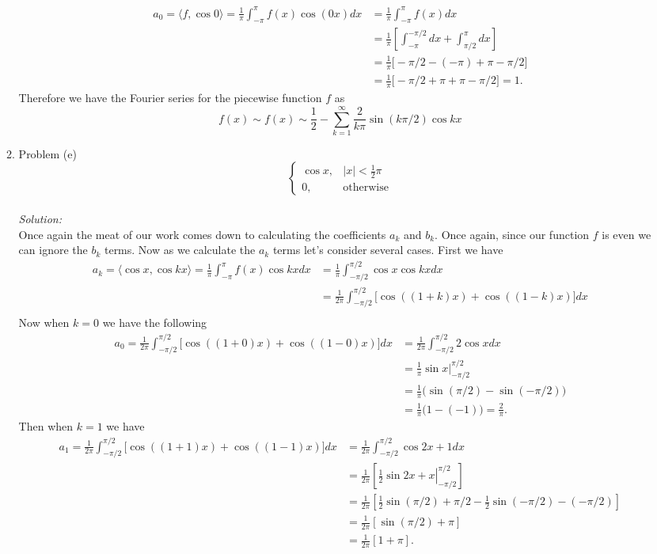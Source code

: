 \documentclass[10pt]{amsart}
\theoremstyle{nonumberplain}
\begin{document}
\begin{enumerate}[label={\bf {\arabic*}:}]
\begin{enumerate}
\begin{align*}
a_0 = \langle f, \cos 0 \rangle = \frac 1 \pi \int_{-\pi}^\pi f(x) \cos (0x) dx &= \frac 1 \pi \int_{-\pi}^\pi f(x) dx \\
	&= \frac 1 \pi \left[ \int_{-\pi}^{-\pi/2} dx +  \int_{\pi/2}^{\pi} dx \right] \\
	&= \frac 1 \pi \Big[ -\pi/2 - (-\pi) + \pi - \pi/2 \Big] \\
	&= \frac 1 \pi \Big[ -\pi/2 + \pi + \pi - \pi/2 \Big] = 1.
\end{align*}
Therefore we have the Fourier series for the piecewise function $f$ as
$$
f(x) \sim f(x) \sim \frac 1 2 - \sum_{k = 1}^\infty \frac 2 {k\pi} \sin (k\pi/2) \cos kx
$$

\item Problem (e)
$$
\begin{cases}
\cos x, & |x| < \frac 1 2 \pi \\
0, &\text{otherwise}
\end{cases}
$$ \\

\noindent
\textit{Solution:} \\
Once again the meat of our work comes down to calculating the coefficients $a_k$ and $b_k$.
Once again, since our function $f$ is even we can ignore the $b_k$ terms.
Now as we calculate the $a_k$ terms let's consider several cases.
First we have
\begin{align*}
a_k = \langle \cos x, \cos kx \rangle = \frac 1 \pi \int_{-\pi}^\pi f(x) \cos kx dx
	&= \frac 1 \pi \int_{-\pi/2}^{\pi/2} \cos x \cos kx dx \\
	&= \frac 1 {2\pi} \int_{-\pi/2}^{\pi/2} \Big[ \cos ((1+ k)x) + \cos ((1- k)x) \Big]dx \\
\end{align*}
Now when $k = 0$ we have the following
\begin{align*}
a_0 = \frac 1 {2\pi} \int_{-\pi/2}^{\pi/2} \Big[ \cos ((1+ 0)x) + \cos ((1- 0)x) \Big]dx &= \frac 1 {2\pi} \int_{-\pi/2}^{\pi/2} 2\cos x dx \\
	&= \frac 1 \pi \left. \sin x \right|_{-\pi/2}^{\pi/2} \\
	&= \frac 1 \pi \Big( \sin (\pi/2) - \sin (- \pi/2) \Big) \\
	&= \frac 1 \pi \Big( 1 - (-1) \Big) = \frac 2 \pi.
\end{align*}
Then when $k = 1$ we have
\begin{align*}
a_1 = \frac 1 {2\pi} \int_{-\pi/2}^{\pi/2} \Big[ \cos ((1+ 1)x) + \cos ((1- 1)x) \Big]dx &= \frac 1 {2\pi} \int_{-\pi/2}^{\pi/2} \cos 2x + 1dx \\
	&= \frac 1 {2\pi} \left[ \left. \frac 1 2 \sin 2x + x\right|_{-\pi/2}^{\pi/2} \right] \\
	&= \frac 1 {2\pi} \left[ \frac 1 2 \sin (\pi/2) + \pi/2 - \frac 1 2 \sin (- \pi/2) - (-\pi/2) \right] \\
	&= \frac 1 {2\pi} \left[ \sin (\pi/2) + \pi \right] \\
	&= \frac 1 {2\pi} \left[ 1 + \pi \right].
\end{align*}


\end{enumerate}
\end{enumerate}
\end{document}
